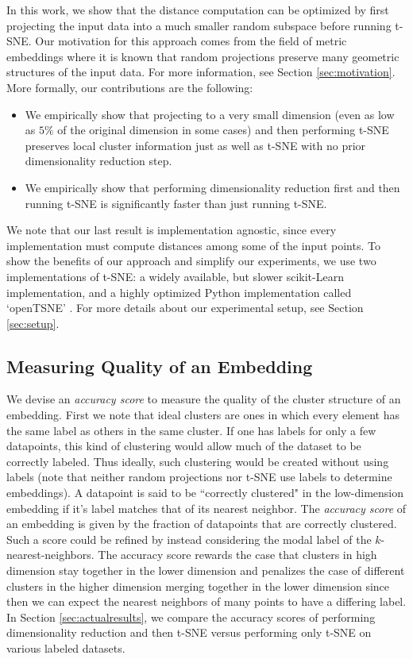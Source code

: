 \documentclass[12pt]{opt2019} %
\begin{document}
In this work, we show that the distance computation can be optimized by first projecting the input data into a much smaller random subspace before running t-SNE. Our motivation for this approach comes from the field of metric embeddings where it is known that random projections preserve many geometric structures of the input data. For more information, see Section \ref{sec:motivation}. More formally, our contributions are the following:
\begin{itemize}
    \item We empirically show that projecting to a very small dimension (even as low as $5\%$ of the original dimension in some cases) and then performing t-SNE preserves local cluster information just as well as t-SNE with no prior dimensionality reduction step.
    \item We empirically show that performing dimensionality reduction first and then running t-SNE is significantly faster than just running t-SNE.
\end{itemize}
We note that our last result is implementation agnostic, since every implementation must compute distances among some of the input points. To show the benefits of our approach and simplify our experiments, we use two implementations of t-SNE: a widely available, but slower scikit-Learn implementation, and a highly optimized Python implementation called `openTSNE' \cite{opentsne}. For more details about our experimental setup, see Section \ref{sec:setup}.

\subsection{Measuring Quality of an Embedding}
We devise an \emph{accuracy score} to measure the quality of the cluster structure of an embedding. First we note that ideal clusters are ones in which every element has the same label as others in the same cluster. If one has labels for only a few datapoints, this kind of clustering would allow much of the dataset to be correctly labeled. Thus ideally, such clustering would be created without using labels (note that neither random projections nor t-SNE use labels to determine embeddings). A datapoint is said to be ``correctly clustered" in the low-dimension embedding if it's label matches that of its nearest neighbor. The \emph{accuracy score} of an embedding is given by the fraction of datapoints that are correctly clustered. Such a score could be refined by instead considering the modal label of the $k$-nearest-neighbors. The accuracy score rewards the case that clusters in high dimension stay together in the lower dimension and penalizes the case of different clusters in the higher dimension merging together in the lower dimension since then we can expect the nearest neighbors of many points to have a differing label. In Section \ref{sec:actualresults}, we compare the accuracy scores of performing dimensionality reduction and then t-SNE versus performing only t-SNE on various labeled datasets.
\end{document}
